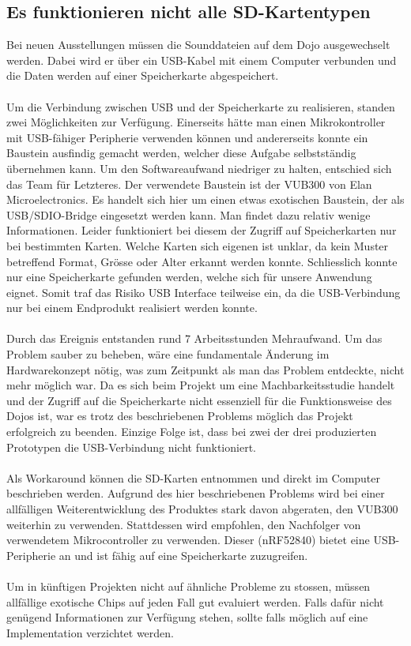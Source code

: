 \subsection{Es funktionieren nicht alle SD-Kartentypen}
Bei neuen Ausstellungen müssen die Sounddateien auf dem Dojo ausgewechselt werden. Dabei wird er über ein USB-Kabel mit einem Computer verbunden und die Daten werden auf einer Speicherkarte abgespeichert. \\
\\
Um die Verbindung zwischen USB und der Speicherkarte zu realisieren, standen zwei Möglichkeiten zur Verfügung. Einerseits hätte man einen Mikrokontroller mit USB-fähiger Peripherie verwenden können und andererseits konnte ein Baustein ausfindig gemacht werden, welcher diese Aufgabe selbstständig übernehmen kann. Um den Softwareaufwand niedriger zu halten, entschied sich das Team für Letzteres. Der verwendete Baustein ist der VUB300 von Elan Microelectronics. Es handelt sich hier um einen etwas exotischen Baustein, der als USB/SDIO-Bridge eingesetzt werden kann. Man findet dazu relativ wenige Informationen. Leider funktioniert bei diesem der Zugriff auf Speicherkarten nur bei bestimmten Karten. Welche Karten sich eigenen ist unklar, da kein Muster betreffend Format, Grösse oder Alter erkannt werden konnte.  Schliesslich konnte nur eine Speicherkarte gefunden werden, welche sich für unsere Anwendung eignet. Somit traf das Risiko USB Interface teilweise ein, da die USB-Verbindung nur bei einem Endprodukt realisiert werden konnte.  \\
\\
Durch das Ereignis entstanden rund 7 Arbeitsstunden Mehraufwand.  Um das Problem sauber zu beheben, wäre eine fundamentale Änderung im Hardwarekonzept nötig, was zum Zeitpunkt als man das Problem entdeckte, nicht mehr möglich war. Da es sich beim Projekt um eine Machbarkeitsstudie handelt und der Zugriff auf die Speicherkarte nicht essenziell für die Funktionsweise des Dojos ist, war es trotz des beschriebenen Problems möglich das Projekt erfolgreich zu beenden.  Einzige Folge ist, dass bei zwei der drei produzierten Prototypen die USB-Verbindung nicht funktioniert.\\
\\
Als Workaround können die SD-Karten entnommen und direkt im Computer beschrieben werden. Aufgrund des hier beschriebenen Problems wird bei einer allfälligen Weiterentwicklung des Produktes stark davon abgeraten, den VUB300 weiterhin zu verwenden. Stattdessen wird empfohlen, den Nachfolger von verwendetem Mikrocontroller zu verwenden. Dieser (nRF52840) bietet eine USB-Peripherie an und ist fähig auf eine Speicherkarte zuzugreifen. \\
\\
Um in künftigen Projekten nicht auf ähnliche Probleme zu stossen, müssen allfällige exotische Chips auf jeden Fall gut evaluiert werden. Falls dafür nicht genügend Informationen zur Verfügung stehen, sollte falls möglich auf eine Implementation verzichtet werden. 